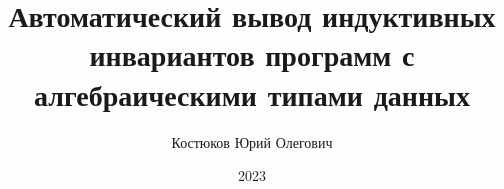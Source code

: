 \title{Автоматический вывод индуктивных инвариантов программ с алгебраическими типами данных}

\author{Костюков Юрий Олегович}




\date{2023}